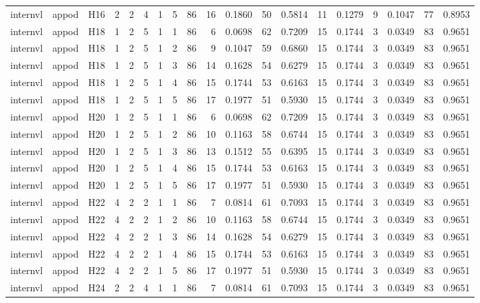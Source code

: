 \begin{longtable}{lllrrrrrrrrrrrrrrrr}
internvl & appod & H16 & 2 & 2 & 4 & 1 & 5 & 86 & 16 & 0.1860 & 50 & 0.5814 & 11 & 0.1279 & 9 & 0.1047 & 77 & 0.8953 \\
internvl & appod & H18 & 1 & 2 & 5 & 1 & 1 & 86 & 6 & 0.0698 & 62 & 0.7209 & 15 & 0.1744 & 3 & 0.0349 & 83 & 0.9651 \\
internvl & appod & H18 & 1 & 2 & 5 & 1 & 2 & 86 & 9 & 0.1047 & 59 & 0.6860 & 15 & 0.1744 & 3 & 0.0349 & 83 & 0.9651 \\
internvl & appod & H18 & 1 & 2 & 5 & 1 & 3 & 86 & 14 & 0.1628 & 54 & 0.6279 & 15 & 0.1744 & 3 & 0.0349 & 83 & 0.9651 \\
internvl & appod & H18 & 1 & 2 & 5 & 1 & 4 & 86 & 15 & 0.1744 & 53 & 0.6163 & 15 & 0.1744 & 3 & 0.0349 & 83 & 0.9651 \\
internvl & appod & H18 & 1 & 2 & 5 & 1 & 5 & 86 & 17 & 0.1977 & 51 & 0.5930 & 15 & 0.1744 & 3 & 0.0349 & 83 & 0.9651 \\
internvl & appod & H20 & 1 & 2 & 5 & 1 & 1 & 86 & 6 & 0.0698 & 62 & 0.7209 & 15 & 0.1744 & 3 & 0.0349 & 83 & 0.9651 \\
internvl & appod & H20 & 1 & 2 & 5 & 1 & 2 & 86 & 10 & 0.1163 & 58 & 0.6744 & 15 & 0.1744 & 3 & 0.0349 & 83 & 0.9651 \\
internvl & appod & H20 & 1 & 2 & 5 & 1 & 3 & 86 & 13 & 0.1512 & 55 & 0.6395 & 15 & 0.1744 & 3 & 0.0349 & 83 & 0.9651 \\
internvl & appod & H20 & 1 & 2 & 5 & 1 & 4 & 86 & 15 & 0.1744 & 53 & 0.6163 & 15 & 0.1744 & 3 & 0.0349 & 83 & 0.9651 \\
internvl & appod & H20 & 1 & 2 & 5 & 1 & 5 & 86 & 17 & 0.1977 & 51 & 0.5930 & 15 & 0.1744 & 3 & 0.0349 & 83 & 0.9651 \\
internvl & appod & H22 & 4 & 2 & 2 & 1 & 1 & 86 & 7 & 0.0814 & 61 & 0.7093 & 15 & 0.1744 & 3 & 0.0349 & 83 & 0.9651 \\
internvl & appod & H22 & 4 & 2 & 2 & 1 & 2 & 86 & 10 & 0.1163 & 58 & 0.6744 & 15 & 0.1744 & 3 & 0.0349 & 83 & 0.9651 \\
internvl & appod & H22 & 4 & 2 & 2 & 1 & 3 & 86 & 14 & 0.1628 & 54 & 0.6279 & 15 & 0.1744 & 3 & 0.0349 & 83 & 0.9651 \\
internvl & appod & H22 & 4 & 2 & 2 & 1 & 4 & 86 & 15 & 0.1744 & 53 & 0.6163 & 15 & 0.1744 & 3 & 0.0349 & 83 & 0.9651 \\
internvl & appod & H22 & 4 & 2 & 2 & 1 & 5 & 86 & 17 & 0.1977 & 51 & 0.5930 & 15 & 0.1744 & 3 & 0.0349 & 83 & 0.9651 \\
internvl & appod & H24 & 2 & 2 & 4 & 1 & 1 & 86 & 7 & 0.0814 & 61 & 0.7093 & 15 & 0.1744 & 3 & 0.0349 & 83 & 0.9651 \\

\end{longtable}
